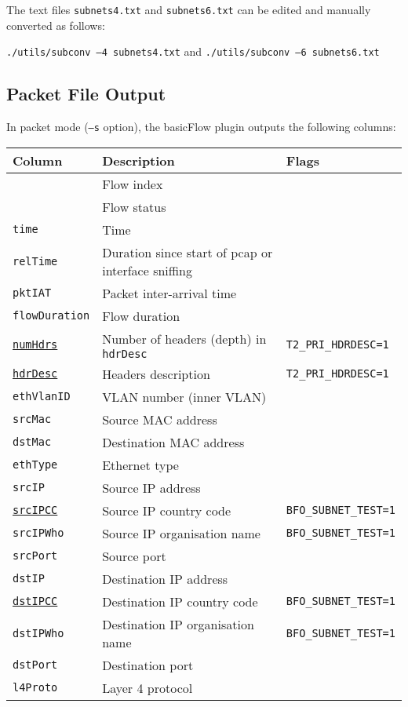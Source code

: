 \documentclass[documentation]{subfiles}
\begin{document}
The text files {\tt subnets4.txt} and {\tt subnets6.txt} can be edited and manually converted as follows:
\begin{center}
{\tt ./utils/subconv --4 subnets4.txt} and
{\tt ./utils/subconv --6 subnets6.txt}
\end{center}

\subsection{Packet File Output}
In packet mode ({\tt --s} option), the basicFlow plugin outputs the following columns:
\begin{longtable}{lll}
    \toprule
    {\bf Column} & {\bf Description} & {\bf Flags}\\
    \midrule\endhead%
    {\tt \nameref{flowInd}}  & Flow index \\
    {\tt \nameref{flowStat}} & Flow status \\
    {\tt time}               & Time \\
    {\tt relTime}            & Duration since start of pcap or interface sniffing\\
    {\tt pktIAT}             & Packet inter-arrival time \\
    {\tt flowDuration}       & Flow duration \\
    {\tt \hyperref[hdrDesc]{numHdrs}}
                             & Number of headers (depth) in {\tt hdrDesc} & {\tt T2\_PRI\_HDRDESC=1}\\
    {\tt \hyperref[hdrDesc]{hdrDesc}}
                             & Headers description                        & {\tt T2\_PRI\_HDRDESC=1}\\
    {\tt ethVlanID}          & VLAN number (inner VLAN) \\
    {\tt srcMac}             & Source MAC address \\
    {\tt dstMac}             & Destination MAC address \\
    {\tt ethType}            & Ethernet type \\
    {\tt srcIP}              & Source IP address\\
    {\tt \hyperref[subnet]{srcIPCC}}
                             & Source IP country code                     & {\tt BFO\_SUBNET\_TEST=1}\\
    {\tt srcIPWho}           & Source IP organisation name                & {\tt BFO\_SUBNET\_TEST=1}\\
    {\tt srcPort}            & Source port \\
    {\tt dstIP}              & Destination IP address \\
    {\tt \hyperref[subnet]{dstIPCC}}
                             & Destination IP country code                & {\tt BFO\_SUBNET\_TEST=1}\\
    {\tt dstIPWho}           & Destination IP organisation name           & {\tt BFO\_SUBNET\_TEST=1}\\
    {\tt dstPort}            & Destination port \\
    {\tt l4Proto}            & Layer 4 protocol \\
    \bottomrule
\end{longtable}
\end{document}
